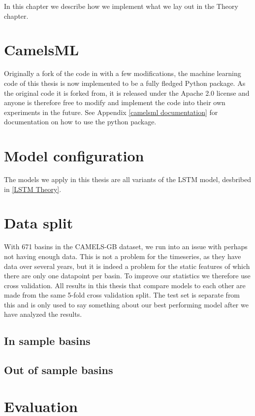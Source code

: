 In this chapter we describe how we implement what we lay out in the Theory chapter.
\section{CamelsML}
Originally a fork of the code in \cite{lstm_second_paper} with a few modifications, 
the machine learning code of this thesis is now implemented to be a fully fledged 
Python package. As the original code it is forked from, it is released under the 
Apache 2.0 license and anyone is therefore free to modify and implement the code 
into their own experiments in the future.
See Appendix \ref{camelsml documentation} for documentation on how to use the python 
package.

\section{Model configuration}
The models we apply in this thesis are all variants of the LSTM model, desbribed in \ref{LSTM Theory}.
\section{Data split}
With 671 basins in the CAMELS-GB dataset, we run into an issue with perhaps not 
having enough data. This is not a problem for the timeseries, as they have data 
over several years, but it is indeed a problem for the static features of which there 
are only one datapoint per basin. To improve our statistics we therefore use 
cross validation. All results in this thesis that compare models to each other 
are made from the same 5-fold cross validation split. The test set is separate 
from this and is only used to say something about our best performing model after 
we have analyzed the results.
\subsection{In sample basins}
\subsection{Out of sample basins}
\section{Evaluation}
